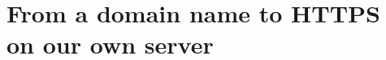 \chapter{From a domain name to HTTPS on our own server}
\label{ch:from-a-domain-name-to-https-on-our-own}

